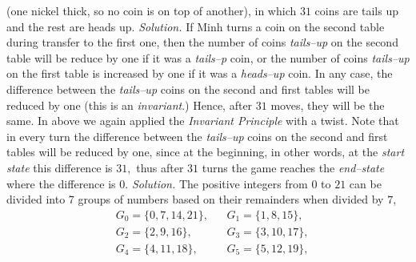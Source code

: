 \begin{multicols}{2}
{		(one nickel thick, so no coin is on top of another), in which $31$ coins are tails up and the rest are heads up.}
	\vskip 0.1cm
	\vskip 0.2cm
	\textit{Solution.}
	If Minh turns a coin on the second table during transfer to the first one,
	then the number of coins \textit{tails--up} on the second table will be reduce by one if it was a \textit{tails--p} coin,
	or the number of coins \textit{tails--up} on the first table is increased by one if it was a \textit{heads--up} coin.
	In any case, the difference between the \textit{tails--up} coins on the second and first tables will be reduced by one
	(this is an \textit{invariant}.) Hence, after $31$ moves, they will be the same.
	\vskip 0.1cm
	In above we again applied the \textit{Invariant Principle} with a twist.
	Note that in every turn the difference between the \textit{tails--up} coins on the second and first tables will be reduced by one,
	since at the beginning, in other words, at the \textit{start state} this difference is $31,$
	thus after $31$ turns the game reaches the \textit{end--state} where the difference is $0.$
	\vskip 0.2cm
	\vskip 0.2cm
	\textit{Solution.}
	The positive integers from $0$ to $21$ can be divided into 7 groups of numbers based on their remainders when divided by $7$,
	\begin{align*}
		&G_0=\{0,7,14,21\}, &&G_1=\{1,8,15\},\\
		& G_2=\{2,9,16\}, &&G_3=\{3,10,17\},\\
		& G_4=\{4,11,18\},&&G_5=\{5,12,19\},\\

\end{align*}
\end{multicols}
